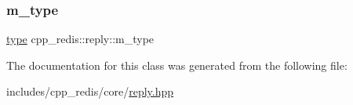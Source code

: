 \mbox{\label{classcpp__redis_1_1reply_a4520fe03b53b783a0f5f74a2d5339815}} 
\subsubsection{\texorpdfstring{m\+\_\+type}{m\_type}}
{\footnotesize\ttfamily \hyperlink{classcpp__redis_1_1reply_acc272b2a52164cac1d110c619a0b25bd}{type} cpp\+\_\+redis\+::reply\+::m\+\_\+type\hspace{0.3cm}{\ttfamily [private]}}



The documentation for this class was generated from the following file\+:\begin{DoxyCompactItemize}
\item 
includes/cpp\+\_\+redis/core/\hyperlink{reply_8hpp}{reply.\+hpp}\end{DoxyCompactItemize}
